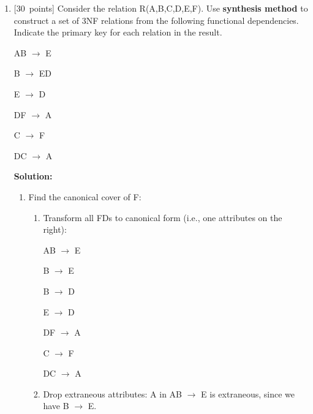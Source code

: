 \newcommand{\eat}[1]{}
\noindent
\begin{enumerate}
\item \mbox{[30 points]}
    Consider the relation R(A,B,C,D,E,F). Use {\bf synthesis method} to construct a set of 3NF relations from the following functional dependencies. Indicate the primary key for each relation in the result.

    \hspace{1 in} AB $\rightarrow$ E

    \hspace{1 in} B $\rightarrow$ ED

    \hspace{1 in} E $\rightarrow$ D

	\hspace{1 in} DF $\rightarrow$ A

 	\hspace{1 in} C $\rightarrow$ F

	\hspace{1 in} DC $\rightarrow$ A

    \textbf{Solution:}
    \begin{enumerate}
        \item Find the canonical cover of F:
            \begin{enumerate}
                \item Transform all FDs to canonical form (i.e., one attributes on the right):
                
                \hspace{0.5 in} AB $\rightarrow$ E
                
                \hspace{0.5 in} B $\rightarrow$ E

                \hspace{0.5 in} B $\rightarrow$ D
                
			    \hspace{0.5 in} E $\rightarrow$ D			

				\hspace{0.5 in} DF $\rightarrow$ A			

			 	\hspace{0.5 in} C $\rightarrow$ F			

				\hspace{0.5 in} DC $\rightarrow$ A

                \item Drop extraneous attributes:           
                A in AB $\rightarrow$ E is extraneous, since we have B $\rightarrow$ E. 
                

\end{enumerate}
\end{enumerate}
\end{enumerate}
